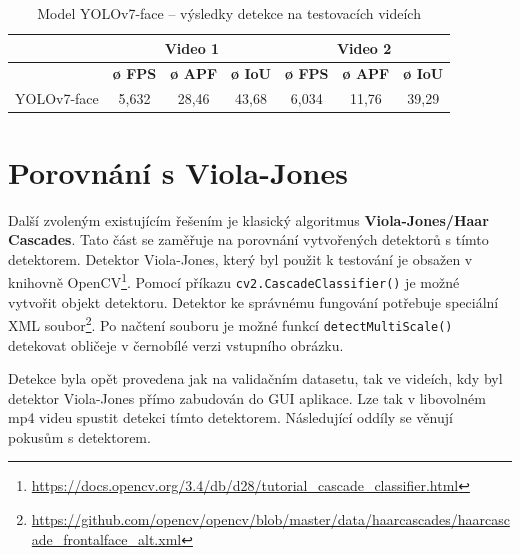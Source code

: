 \begin{table}[H]
  \centering
  \begin{tabular}{c|ccc|ccc|}
  \cline{2-7}
                                                               & \multicolumn{3}{c|}{\cellcolor[HTML]{CBCEFB}\textbf{Video 1}}                                                                              & \multicolumn{3}{c|}{\cellcolor[HTML]{CBCEFB}\textbf{Video 2}}                                                                              \\ \hline
  \rowcolor[HTML]{E0DBDB} 
  \multicolumn{1}{|c|}{\cellcolor[HTML]{E0DBDB}\textbf{Model}} & \multicolumn{1}{c|}{\cellcolor[HTML]{E0DBDB}\textbf{ø FPS}} & \multicolumn{1}{c|}{\cellcolor[HTML]{E0DBDB}\textbf{ø APF}} & \textbf{ø IoU} & \multicolumn{1}{c|}{\cellcolor[HTML]{E0DBDB}\textbf{ø FPS}} & \multicolumn{1}{c|}{\cellcolor[HTML]{E0DBDB}\textbf{ø APF}} & \textbf{ø IoU} \\ \hline
  \multicolumn{1}{|c|}{\cellcolor[HTML]{E0DBDB}YOLOv7-face}    & \multicolumn{1}{c|}{5,632}                                  & \multicolumn{1}{c|}{28,46}                                  & 43,68          & \multicolumn{1}{c|}{6,034}                                  & \multicolumn{1}{c|}{11,76}                                  & 39,29          \\ \hline
  \end{tabular}
  \label{tabulka:yolov7facevidea}
  \caption{Model YOLOv7-face -- výsledky detekce na testovacích videích}
\end{table}

\section{Porovnání s Viola-Jones}
\label{sekce:vj}
Další zvoleným existujícím řešením je klasický algoritmus \textbf{Viola-Jones/Haar Cascades}. Tato část se zaměřuje na porovnání vytvořených detektorů s tímto detektorem. Detektor Viola-Jones, který byl použit k testování je obsažen v knihovně OpenCV\footnote{\url{https://docs.opencv.org/3.4/db/d28/tutorial_cascade_classifier.html}}. Pomocí příkazu \texttt{cv2.CascadeClassifier()} je možné vytvořit objekt detektoru. Detektor ke správnému fungování potřebuje speciální XML soubor\footnote{\url{https://github.com/opencv/opencv/blob/master/data/haarcascades/haarcascade_frontalface_alt.xml}}. Po načtení souboru je možné funkcí \texttt{detectMultiScale()} detekovat obličeje v černobílé verzi vstupního obrázku.

Detekce byla opět provedena jak na validačním datasetu, tak ve videích, kdy byl detektor Viola-Jones přímo zabudován do GUI aplikace. Lze tak v libovolném mp4 videu spustit detekci tímto detektorem. Následující oddíly se věnují pokusům s detektorem.

